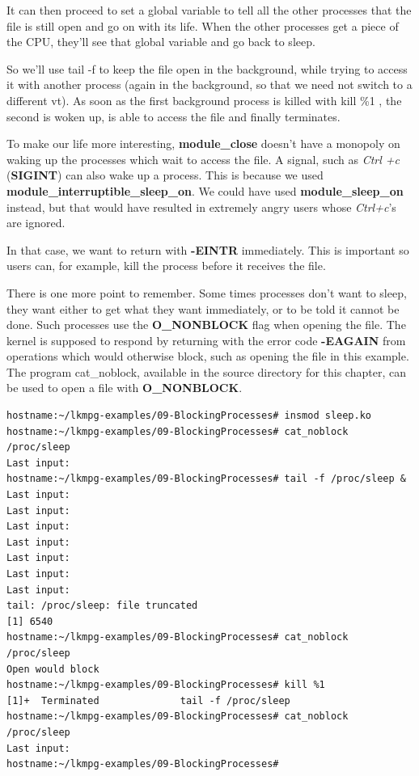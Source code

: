 \documentclass[11pt]{article}
\begin{document}
It can then proceed to set a global variable to tell all the other processes that the file is still open and go on with its life. When the other processes get a piece of the CPU, they'll see that global variable and go back to sleep.

So we'll use tail -f to keep the file open in the background, while trying to access it with another process (again in the background, so that we need not switch to a different vt). As soon as the first background process is killed with kill \%1 , the second is woken up, is able to access the file and finally terminates.

To make our life more interesting, \textbf{module\_close} doesn't have a monopoly on waking up the processes which wait to access the file. A signal, such as \emph{Ctrl +c} (\textbf{SIGINT}) can also wake up a process. This is because we used \textbf{module\_interruptible\_sleep\_on}. We could have used \textbf{module\_sleep\_on} instead, but that would have resulted in extremely angry users whose \emph{Ctrl+c}'s are ignored.

In that case, we want to return with \textbf{-EINTR} immediately. This is important so users can, for example, kill the process before it receives the file.

There is one more point to remember. Some times processes don't want to sleep, they want either to get what they want immediately, or to be told it cannot be done. Such processes use the \textbf{O\_NONBLOCK} flag when opening the file. The kernel is supposed to respond by returning with the error code \textbf{-EAGAIN} from operations which would otherwise block, such as opening the file in this example. The program cat\_noblock, available in the source directory for this chapter, can be used to open a file with \textbf{O\_NONBLOCK}.

\begin{verbatim}
hostname:~/lkmpg-examples/09-BlockingProcesses# insmod sleep.ko
hostname:~/lkmpg-examples/09-BlockingProcesses# cat_noblock /proc/sleep
Last input:
hostname:~/lkmpg-examples/09-BlockingProcesses# tail -f /proc/sleep &
Last input:
Last input:
Last input:
Last input:
Last input:
Last input:
Last input:
tail: /proc/sleep: file truncated
[1] 6540
hostname:~/lkmpg-examples/09-BlockingProcesses# cat_noblock /proc/sleep
Open would block
hostname:~/lkmpg-examples/09-BlockingProcesses# kill %1
[1]+  Terminated              tail -f /proc/sleep
hostname:~/lkmpg-examples/09-BlockingProcesses# cat_noblock /proc/sleep
Last input:
hostname:~/lkmpg-examples/09-BlockingProcesses#
\end{verbatim}
\end{document}

